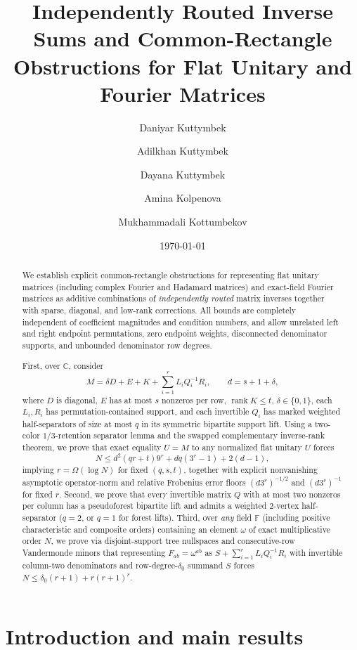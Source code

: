 \documentclass[11pt,reqno]{amsart}
\title[Independently Routed Inverse Sums]{Independently Routed Inverse Sums and Common-Rectangle\\Obstructions for Flat Unitary and Fourier Matrices}
\author[D. Kuttymbek]{Daniyar Kuttymbek}
\author[A. Kuttymbek]{Adilkhan Kuttymbek}
\author[D. Kuttymbek]{Dayana Kuttymbek}
\author[A. Kolpenova]{Amina Kolpenova}
\author[M. Kottumbekov]{Mukhammadali Kottumbekov}
\date{\today}
\numberwithin{equation}{section}
\theoremstyle{definition}
\theoremstyle{remark}
\newcommand{\C}{\mathbb{C}}
\newcommand{\F}{\mathbb{F}}
\newcommand{\rank}{\operatorname{rank}}
\begin{document}
\begin{abstract}
We establish explicit common-rectangle obstructions for representing flat unitary matrices (including complex Fourier and Hadamard matrices) and exact-field Fourier matrices as additive combinations of \emph{independently routed} matrix inverses together with sparse, diagonal, and low-rank corrections. All bounds are completely independent of coefficient magnitudes and condition numbers, and allow unrelated left and right endpoint permutations, zero endpoint weights, disconnected denominator supports, and unbounded denominator row degrees.

First, over $\C$, consider
\[
M = \delta D + E + K + \sum_{i=1}^r L_i Q_i^{-1} R_i,\qquad d = s + 1 + \delta,
\]
where $D$ is diagonal, $E$ has at most $s$ nonzeros per row, $\rank K\le t$, $\delta\in\{0,1\}$, each $L_i,R_i$ has permutation-contained support, and each invertible $Q_i$ has marked weighted half-separators of size at most $q$ in its symmetric bipartite support lift. Using a two-color $1/3$-retention separator lemma and the swapped complementary inverse-rank theorem, we prove that exact equality $U=M$ to any normalized flat unitary $U$ forces
\[
N \le d^2(qr+t)9^r + dq(3^r - 1) + 2(d - 1),
\]
implying $r=\Omega(\log N)$ for fixed $(q,s,t)$, together with explicit nonvanishing asymptotic operator-norm and relative Frobenius error floors $(d3^r)^{-1/2}$ and $(d3^r)^{-1}$ for fixed $r$. Second, we prove that every invertible matrix $Q$ with at most two nonzeros per column has a pseudoforest bipartite lift and admits a weighted $2$-vertex half-separator ($q=2$, or $q=1$ for forest lifts). Third, over \emph{any} field $\F$ (including positive characteristic and composite orders) containing an element $\omega$ of exact multiplicative order $N$, we prove via disjoint-support tree nullspaces and consecutive-row Vandermonde minors that representing $F_{ab}=\omega^{ab}$ as $S+\sum_{i=1}^r L_i Q_i^{-1} R_i$ with invertible column-two denominators and row-degree-$\delta_0$ summand $S$ forces $N \le \delta_0(r+1) + r(r+1)^r$.
\end{abstract}

\maketitle

\section{Introduction and main results}
\label{sec:intro}
\end{document}
